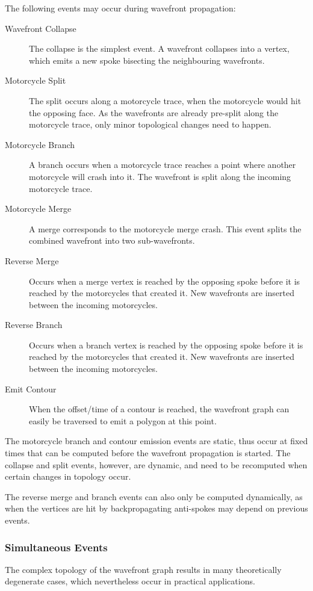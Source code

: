 \documentclass[12pt,a4paper,oneside,openany]{article}
\begin{document}
The following events may occur during wavefront propagation:
\begin{description}
\item[Wavefront Collapse] The collapse is the simplest event. A wavefront collapses into a vertex, which emits a new spoke bisecting the neighbouring wavefronts.
\item[Motorcycle Split] The split occurs along a motorcycle trace, when the motorcycle would hit the opposing face. As the wavefronts are already pre-split along the motorcycle trace, only minor topological changes need to happen.
\item[Motorcycle Branch] A branch occurs when a motorcycle trace reaches a point where another motorcycle will crash into it. The wavefront is split along the incoming motorcycle trace.
\item[Motorcycle Merge] A merge corresponds to the motorcycle merge crash. This event splits the combined wavefront into two sub-wavefronts.
\item[Reverse Merge] Occurs when a merge vertex is reached by the opposing spoke before it is reached by the motorcycles that created it. New wavefronts are inserted between the incoming motorcycles.
\item[Reverse Branch] Occurs when a branch vertex is reached by the opposing spoke before it is reached by the motorcycles that created it. New wavefronts are inserted between the incoming motorcycles.
\item[Emit Contour] When the offset/time of a contour is reached, the wavefront graph can easily be traversed to emit a polygon at this point.
\end{description}

The motorcycle branch and contour emission events are static, thus occur at fixed times that can be computed before the wavefront propagation is started. The collapse and split events, however, are dynamic, and need to be recomputed when certain changes in topology occur.

The reverse merge and branch events can also only be computed dynamically, as when the vertices are hit by backpropagating anti-spokes may depend on previous events.

\subsubsection{Simultaneous Events}

The complex topology of the wavefront graph results in many theoretically degenerate cases, which nevertheless occur in practical applications.
\end{document}
